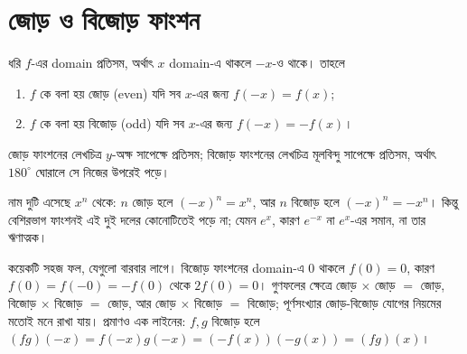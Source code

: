 \documentclass[11pt]{article}
\begin{document}
\section{জোড় ও বিজোড় ফাংশন}

\begin{idea}[জোড় ও বিজোড়]
ধরি $f$-এর domain প্রতিসম, অর্থাৎ $x$ domain-এ থাকলে $-x$-ও থাকে। তাহলে
\begin{enumerate}
  \item $f$ কে বলা হয় জোড় (even) যদি সব $x$-এর জন্য $f(-x) = f(x)$;
  \item $f$ কে বলা হয় বিজোড় (odd) যদি সব $x$-এর জন্য $f(-x) = -f(x)$।
\end{enumerate}
জোড় ফাংশনের লেখচিত্র $y$-অক্ষ সাপেক্ষে প্রতিসম; বিজোড় ফাংশনের লেখচিত্র মূলবিন্দু
সাপেক্ষে প্রতিসম, অর্থাৎ $180^{\circ}$ ঘোরালে সে নিজের উপরেই পড়ে।
\end{idea}

\begin{center}
\end{center}

নাম দুটি এসেছে $x^{n}$ থেকে: $n$ জোড় হলে $(-x)^{n} = x^{n}$, আর $n$ বিজোড় হলে
$(-x)^{n} = -x^{n}$। কিন্তু বেশিরভাগ ফাংশনই এই দুই দলের কোনোটিতেই পড়ে না;
যেমন $e^{x}$, কারণ $e^{-x}$ না $e^{x}$-এর সমান, না তার ঋণাত্মক।

কয়েকটি সহজ ফল, যেগুলো বারবার লাগে। বিজোড় ফাংশনের domain-এ $0$ থাকলে
$f(0) = 0$, কারণ $f(0) = f(-0) = -f(0)$ থেকে $2f(0) = 0$। গুণফলের ক্ষেত্রে
জোড় $\times$ জোড় $=$ জোড়, বিজোড় $\times$ বিজোড় $=$ জোড়, আর
জোড় $\times$ বিজোড় $=$ বিজোড়; পূর্ণসংখ্যার জোড়-বিজোড় যোগের নিয়মের মতোই মনে
রাখা যায়। প্রমাণও এক লাইনের: $f, g$ বিজোড় হলে
$(fg)(-x) = f(-x)g(-x) = (-f(x))(-g(x)) = (fg)(x)$।
\end{document}
